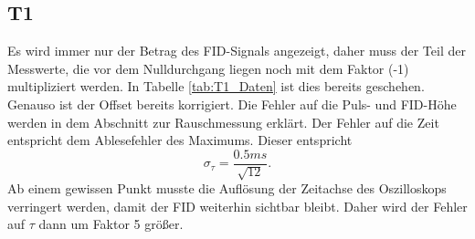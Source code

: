\documentclass[12pt,a4paper]{article}
\begin{document}
\subsection{T1}
Es wird immer nur der Betrag des FID-Signals angezeigt, daher muss der Teil der Messwerte, die vor dem Nulldurchgang liegen noch mit dem Faktor (-1) multipliziert werden. In Tabelle \ref{tab:T1_Daten} ist dies bereits geschehen. Genauso ist der Offset bereits korrigiert. Die Fehler auf die Puls- und FID-Höhe werden in dem Abschnitt zur Rauschmessung erklärt. Der Fehler auf die Zeit entspricht dem Ablesefehler des Maximums. Dieser entspricht
\begin{equation*}
\sigma _{\tau} = \dfrac{0.5 ms}{\sqrt{12}}.
\end{equation*}
Ab einem gewissen Punkt musste die Auflösung der Zeitachse des Oszilloskops verringert werden, damit der FID weiterhin sichtbar bleibt. Daher wird der Fehler auf $\tau$ dann um Faktor 5 größer.
\end{document}
